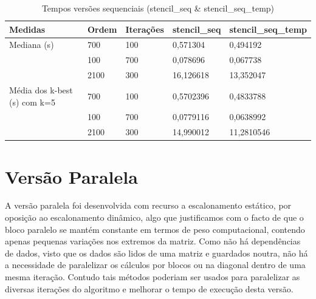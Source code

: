 \documentclass{article}
\begin{document}
\begin{table}[H]
    \centering
    \begin{tabular}{| l | l | l | l | l |}
      \hline			
       \textbf{Medidas}  & \textbf{Ordem} & \textbf{Iterações} & \textbf{stencil\_seq} & \textbf{stencil\_seq\_temp} \\ \hline
    Mediana (s) & 700 & 100 & 0,571304 & 0,494192 \\ 
                & 100 & 700 & 0,078696 & 0,067738 \\
                & 2100 & 300 & 16,126618 & 13,352047 \\ \hline
    Média dos k-best (s) com k=5 & 700 & 100 & 0,5702396 & 0,4833788 \\
                                 & 100 & 700 & 0,0779116 & 0,0638992 \\
                                 & 2100 & 300 & 14,990012 & 11,2810546 \\
      \hline  
    \end{tabular}
    \caption{Tempos versões sequenciais (stencil\_seq \& stencil\_seq\_temp)}
    \label{tab:parallel_times}
\end{table}

\section{Versão Paralela}

A versão paralela foi desenvolvida com recurso a escalonamento estático, por oposição ao escalonamento dinâmico, algo que justificamos com o facto de que o bloco paralelo se mantém constante em termos de peso computacional, contendo apenas pequenas variações nos extremos da matriz. Como não há dependências de dados, visto que os dados são lidos de uma matriz e guardados noutra, não há a necessidade de paralelizar os cálculos por blocos ou na diagonal dentro de uma mesma iteração. Contudo tais métodos poderiam ser usados para paralelizar as diversas iterações do algoritmo e melhorar o tempo de execução desta versão.
\end{document}
